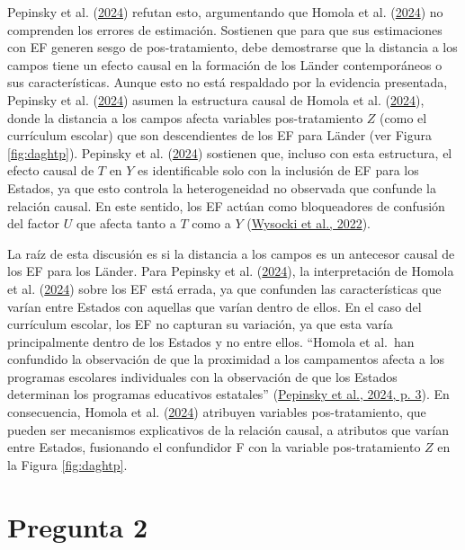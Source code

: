 \documentclass[
  12pt,
  a4paper,
]{article}
\begin{document}
Pepinsky et al. (\protect\hyperlink{ref-pepinsky_causation_2024}{2024}) refutan esto, argumentando que Homola et al. (\protect\hyperlink{ref-homola_fixed_2024}{2024}) no comprenden los errores de estimación. Sostienen que para que sus estimaciones con EF generen sesgo de pos-tratamiento, debe demostrarse que la distancia a los campos tiene un efecto causal en la formación de los Länder contemporáneos o sus características. Aunque esto no está respaldado por la evidencia presentada, Pepinsky et al. (\protect\hyperlink{ref-pepinsky_causation_2024}{2024}) asumen la estructura causal de Homola et al. (\protect\hyperlink{ref-homola_fixed_2024}{2024}), donde la distancia a los campos afecta variables pos-tratamiento \(Z\) (como el currículum escolar) que son descendientes de los EF para Länder (ver Figura \ref{fig:daghtp}). Pepinsky et al. (\protect\hyperlink{ref-pepinsky_causation_2024}{2024}) sostienen que, incluso con esta estructura, el efecto causal de \(T\) en \(Y\) es identificable solo con la inclusión de EF para los Estados, ya que esto controla la heterogeneidad no observada que confunde la relación causal. En este sentido, los EF actúan como bloqueadores de confusión del factor \(U\) que afecta tanto a \(T\) como a \(Y\) (\protect\hyperlink{ref-wysocki_statistical_2022}{Wysocki et al., 2022}).

La raíz de esta discusión es si la distancia a los campos es un antecesor causal de los EF para los Länder. Para Pepinsky et al. (\protect\hyperlink{ref-pepinsky_causation_2024}{2024}), la interpretación de Homola et al. (\protect\hyperlink{ref-homola_fixed_2024}{2024}) sobre los EF está errada, ya que confunden las características que varían entre Estados con aquellas que varían dentro de ellos. En el caso del currículum escolar, los EF no capturan su variación, ya que esta varía principalmente dentro de los Estados y no entre ellos. ``Homola et al.~han confundido la observación de que la proximidad a los campamentos afecta a los programas escolares individuales con la observación de que los Estados determinan los programas educativos estatales'' (\protect\hyperlink{ref-pepinsky_causation_2024}{Pepinsky et al., 2024, p. 3}). En consecuencia, Homola et al. (\protect\hyperlink{ref-homola_fixed_2024}{2024}) atribuyen variables pos-tratamiento, que pueden ser mecanismos explicativos de la relación causal, a atributos que varían entre Estados, fusionando el confundidor F con la variable pos-tratamiento \(Z\) en la Figura \ref{fig:daghtp}.

\hypertarget{pregunta-2}{%
\section{Pregunta 2}\label{pregunta-2}}
\end{document}
